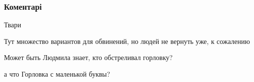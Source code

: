  
 
 
 
 
\subsubsection{Коментарі}
\label{sec:27_07_2018.fb.medvedeva_olesja.1.gorlovka.cmt}

\begin{itemize}
 
Твари

\begin{itemize}
 
Тут множество вариантов для обвинений, но людей не вернуть уже, к сожалению

 
Может быть Людмила знает, кто обстреливал горловку?

 
а что Горловка с маленькой буквы?

 

\end{itemize}
\end{itemize}

